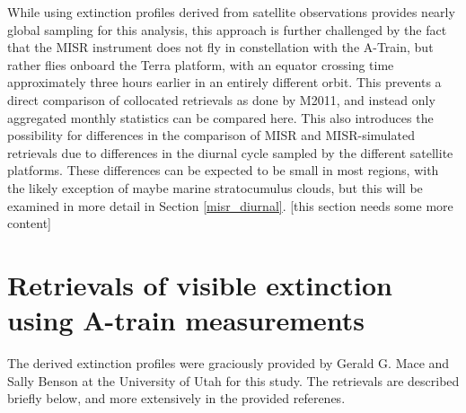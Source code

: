 While using extinction profiles derived from satellite observations provides nearly global sampling for this analysis, this approach is further challenged by the fact that the MISR instrument does not fly in constellation with the A-Train, but rather flies onboard the Terra platform, with an equator crossing time approximately three hours earlier in an entirely different orbit. This prevents a direct comparison of collocated retrievals as done by M2011, and instead only aggregated monthly statistics can be compared here. This also introduces the possibility for differences in the comparison of MISR and MISR-simulated retrievals due to differences in the diurnal cycle sampled by the different satellite platforms. These differences can be expected to be small in most regions, with the likely exception of maybe marine stratocumulus clouds, but this will be examined in more detail in Section \ref{misr_diurnal}.
[this section needs some more content]

\section{Retrievals of visible extinction using A-train measurements}
\label{cc_retrievals}

The derived extinction profiles were graciously provided by Gerald G. Mace and Sally Benson at the University of Utah for this study. The retrievals are described briefly below, and more extensively in the provided referenes. 

